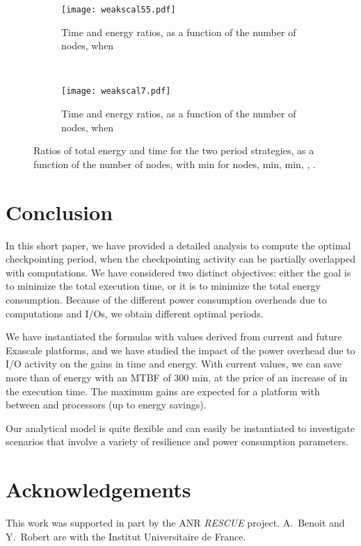 \documentclass[a4paper]{article}
\begin{document}
\begin{figure}
    \centering
  \begin{subfigure}[b]{0.7\textwidth}
    \centering
    \texttt{[image: weakscal55.pdf]}
    \caption{Time and energy ratios, as a function of the
      number of nodes, when }\label{fig:weak55}
  \end{subfigure}\\
  \begin{subfigure}[b]{0.7\textwidth}
    \centering
    \texttt{[image: weakscal7.pdf]}
    \caption{Time and energy ratios, as a function of the
      number of nodes, when }\label{fig:weak7}
  \end{subfigure}  
  \caption{Ratios of total energy and time for the two period strategies, as a function of the
      number of nodes, with  min 
      for  nodes,  min,  min, , .\label{fig3}}
\end{figure}

\section{Conclusion}
\label{sec.conclusion}

In this short paper, we have provided a detailed analysis to compute the 
optimal checkpointing period, when the checkpointing activity can be partially
overlapped with computations. We have considered two distinct objectives:
either the goal is to minimize the total execution time, or it is to minimize
the total energy consumption. Because of the different power consumption overheads
due to computations and I/Os, we obtain different optimal periods. 

We have instantiated the formulas with values derived from current and future
Exascale platforms, and we have studied the impact of the power overhead
due to I/O activity on the gains in time and energy. With current values, we can save
more than  of energy with an MTBF of 300 min, at the price of an increase of 
 in the execution time. The maximum gains are expected for a platform
with between  and  processors (up to  energy savings). 

Our analytical model is quite flexible and can easily be instantiated to investigate scenarios
that involve a variety of resilience and power consumption parameters.

\section*{Acknowledgements} 

This work was supported in part by the ANR {\em RESCUE} project. 
A.~Benoit and Y.~Robert are with the Institut Universitaire de France.

\clearpage


\end{document}
